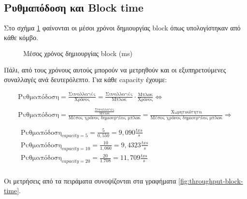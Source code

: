 \documentclass{article}
\newcommand{\eng}[1]{\foreignlanguage{english}{#1}} %
\begin{document}
\clearpage
\subsection{Ρυθμαπόδοση και \eng{Block time}}

Στο σχήμα \ref{fig:scalability-blocktimes} φαίνονται οι μέσοι χρόνοι δημιουργίας
\eng{block} όπως υπολογίστηκαν από κάθε κόμβο.

\begin{figure}[ht]
    \centering
    \begin{varwidth}{\linewidth}
        
    \end{varwidth}
    \caption{Μέσος χρόνος δημιουργίας \eng{block} (\eng{ms})}
    \label{fig:scalability-blocktimes}
\end{figure}

Πάλι, από τους χρόνους αυτούς μπορούν να μετρηθούν και οι εξυπηρετούμενες
συναλλαγές ανά δευτερόλεπτο. Για κάθε \eng{capacity} έχουμε:

\begin{equation}
    \begin{gathered}
        \text{Ρυθμαπόδοση} = \frac{\text{Συναλλαγές}}{\text{Χρόνος}} = \frac{\text{Συναλλαγές}}{\text{Μπλοκ}}\cdot \frac{\text{Μπλοκ}}{\text{Χρόνος}} \Leftrightarrow \\
        \\
        \text{Ρυθμαπόδοση} = \frac{\frac{\text{Συναλλαγές}}{\text{Μπλοκ}} }{\text{Μέσος χρόνος δημιουργίας μπλοκ}} = \frac{\text{Χωρητικότητα}}{\text{Μέσος χρόνος δημιουργίας μπλοκ}} \Rightarrow \\
    \\
    \boxed{
        \begin{gathered}
            \text{Ρυθμαπόδοση}_{capacity=5} = \frac{5}{0,550} = 9,090 \text{} \frac{txs}{s}\\
            \text{Ρυθμαπόδοση}_{capacity=10} = \frac{10}{1,060} = 9,4323 \text{} \frac{txs}{s}\\
            \text{Ρυθμαπόδοση}_{capacity=20} = \frac{20}{1.708} = 11,709 \text{} \frac{txs}{s}\\
        \end{gathered}
    }
    \end{gathered}
\end{equation}

Οι μετρήσεις από τα πειράματα συνοψίζονται στα γραφήματα \ref{fig:throughput-block-time}.
\end{document}
